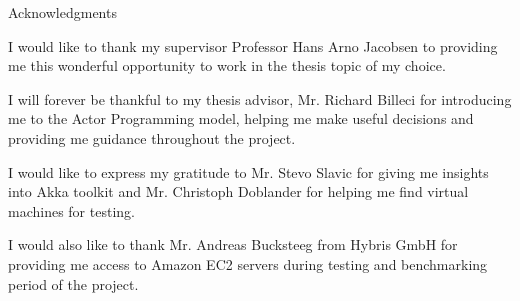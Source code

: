 \thispagestyle{empty}

\vspace*{2cm}

\begin{center}
{ Acknowledgments}
\end{center}

\vspace{1cm}

  I would like to thank my supervisor Professor Hans Arno Jacobsen to providing me this wonderful opportunity to work in the thesis topic of my choice.

  I will forever be thankful to my thesis advisor, Mr. Richard Billeci for introducing me to the Actor Programming model, helping me make useful decisions and providing me guidance throughout the project.

  I would like to express my gratitude to Mr. Stevo Slavic for giving me insights into Akka toolkit and Mr. Christoph Doblander for helping me find virtual machines for testing.

  I would also like to thank Mr. Andreas Bucksteeg from Hybris GmbH for providing me access to Amazon EC2 servers during testing and benchmarking period of the project.

\cleardoublepage{}
